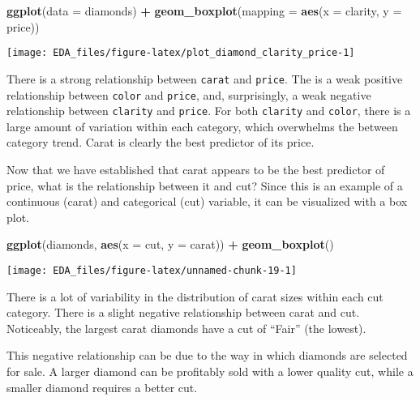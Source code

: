 \documentclass[]{book}
\newenvironment{Shaded}{\begin{snugshade}}{\end{snugshade}}
\newcommand{\DataTypeTok}[1]{\textcolor[rgb]{0.13,0.29,0.53}{#1}}
\newcommand{\KeywordTok}[1]{\textcolor[rgb]{0.13,0.29,0.53}{\textbf{#1}}}
\newcommand{\NormalTok}[1]{#1}
\newcommand{\OperatorTok}[1]{\textcolor[rgb]{0.81,0.36,0.00}{\textbf{#1}}}
\newcommand{\StringTok}[1]{\textcolor[rgb]{0.31,0.60,0.02}{#1}}
\theoremstyle{plain}
\theoremstyle{remark}
\theoremstyle{definition}
\theoremstyle{definition}
\theoremstyle{definition}
\theoremstyle{remark}
\begin{document}
\begin{Shaded}
\begin{Highlighting}[]
\KeywordTok{ggplot}\NormalTok{(}\DataTypeTok{data =}\NormalTok{ diamonds) }\OperatorTok{+}
\StringTok{  }\KeywordTok{geom_boxplot}\NormalTok{(}\DataTypeTok{mapping =} \KeywordTok{aes}\NormalTok{(}\DataTypeTok{x =}\NormalTok{ clarity, }\DataTypeTok{y =}\NormalTok{ price))}
\end{Highlighting}
\end{Shaded}

\begin{center}\texttt{[image: EDA\_files/figure-latex/plot\_diamond\_clarity\_price-1]} \end{center}

There is a strong relationship between \texttt{carat} and
\texttt{price}. The is a weak positive relationship between
\texttt{color} and \texttt{price}, and, surprisingly, a weak negative
relationship between \texttt{clarity} and \texttt{price}. For both
\texttt{clarity} and \texttt{color}, there is a large amount of
variation within each category, which overwhelms the between category
trend. Carat is clearly the best predictor of its price.

Now that we have established that carat appears to be the best predictor
of price, what is the relationship between it and cut? Since this is an
example of a continuous (carat) and categorical (cut) variable, it can
be visualized with a box plot.

\begin{Shaded}
\begin{Highlighting}[]
\KeywordTok{ggplot}\NormalTok{(diamonds, }\KeywordTok{aes}\NormalTok{(}\DataTypeTok{x =}\NormalTok{ cut, }\DataTypeTok{y =}\NormalTok{ carat)) }\OperatorTok{+}
\StringTok{  }\KeywordTok{geom_boxplot}\NormalTok{()}
\end{Highlighting}
\end{Shaded}

\begin{center}\texttt{[image: EDA\_files/figure-latex/unnamed-chunk-19-1]} \end{center}

There is a lot of variability in the distribution of carat sizes within
each cut category. There is a slight negative relationship between carat
and cut. Noticeably, the largest carat diamonds have a cut of ``Fair''
(the lowest).

This negative relationship can be due to the way in which diamonds are
selected for sale. A larger diamond can be profitably sold with a lower
quality cut, while a smaller diamond requires a better cut.
\end{document}

